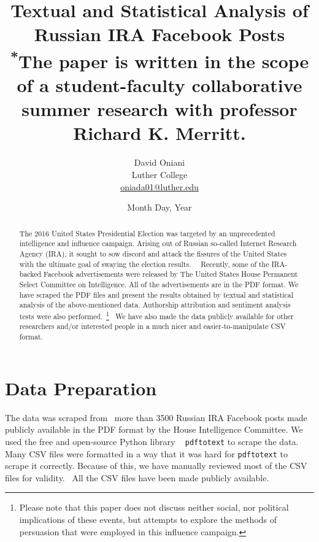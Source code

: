 \documentclass[11pt]{article}
\author{David Oniani\\
        Luther College\\
        \href{mailto:oniada01@luther.edu}{oniada01@luther.edu}}
\title{\textbf{Textual and Statistical Analysis of Russian IRA Facebook Posts}\\
      \small \textsuperscript{*}The paper is written in the scope of a student-faculty collaborative\\
                                summer research with professor Richard K. Merritt.}
\date{Month Day, Year}
\theoremstyle{definition}
\begin{document}
\maketitle


\begin{abstract}

\noindent The 2016 United States Presidential Election was targeted by an
unprecedented intelligence and influence campaign. Arising out of Russian
so-called Internet Research Agency (IRA), it sought to sow discord and attack
the fissures of the United States with the ultimate goal of swaying the
election results.~\cite{ira2016}~\cite{ira2016data} Recently, some of the
IRA-backed Facebook advertisements were released by The United States House
Permanent Select Committee on Intelligence.  All of the advertisements are in
the PDF format. We have scraped the PDF files and present the results obtained
by textual and statistical analysis of the above-mentioned data. Authorship
attribution and sentiment analysis tests were also performed.~\footnote{Please
note that this paper does not discuss neither social, nor political implications
of these events, but attempts to explore the methods of persuasion that were
employed in this influence campaign.}~\cite{ira2016csvdata} We have also made
the data publicly available for other researchers and/or interested people in
a much nicer and easier-to-manipulate CSV format.
\end{abstract}


\newpage
\tableofcontents
\newpage


\section*{\centering Data Preparation}

The data was scraped from~\cite{ira2016data} more than 3500 Russian IRA
Facebook posts made publicly available in the PDF format by the House
Intelligence Committee. We used the free and open-source Python library
~\cite{pdftotext} \texttt{pdftotext} to scrape the data. Many CSV files were
formatted in a way that it was hard for \texttt{pdftotext} to scrape it
correctly. Because of this, we have manually reviewed most of the CSV files
for validity.~\cite{ira2016csvdata} All the CSV files have been made publicly
available.
\end{document}
